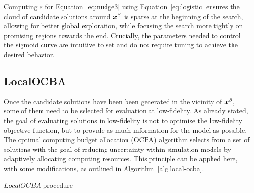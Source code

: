 Computing $\varepsilon$ for Equation~\ref{eq:nudge3} using Equation~\ref{eq:logistic} ensures the cloud of candidate solutions around $\boldsymbol{x}^\beta$ is sparse at the beginning of the search, allowing for better global exploration, while focusing the search more tightly on promising regions towards the end. Crucially, the parameters needed to control the sigmoid curve are intuitive to set and do not require tuning to achieve the desired behavior.

\subsection{LocalOCBA}\label{subsec:local}
Once the candidate solutions have been been generated in the vicinity of $\boldsymbol{x}^\beta$, some of them need to be selected for evaluation at low-fidelity. As already stated, the goal of evaluating solutions in low-fidelity is not to optimize the low-fidelity objective function, but to provide as much information for the model as possible. The optimal computing budget allocation (OCBA) algorithm selects from a set of solutions with the goal of reducing uncertainty within simulation models by adaptively allocating computing resources. This principle can be applied here, with some modifications, as outlined in Algorithm~\ref{alg:local-ocba}.

\begin{algorithm}[h!] 
\caption{$LocalOCBA$ procedure}
\label{alg:local-ocba}
{\footnotesize
\begin{algorithmic}[1]
 
 
 
 
\label{while-loop}
   
   
   
   
   
\ENDWHILE
{} 
\end{algorithmic}
}
\end{algorithm}

